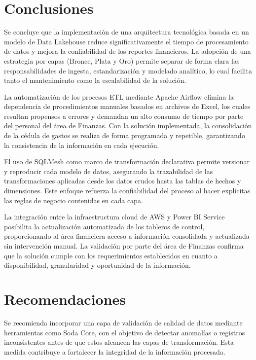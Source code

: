\section{Conclusiones}

Se concluye que la implementación de una arquitectura tecnológica basada en un modelo de Data Lakehouse reduce significativamente el tiempo de procesamiento de datos y mejora la confiabilidad de los reportes financieros. La adopción de una estrategia por capas (Bronce, Plata y Oro) permite separar de forma clara las responsabilidades de ingesta, estandarización y modelado analítico, lo cual facilita tanto el mantenimiento como la escalabilidad de la solución.

La automatización de los procesos ETL mediante Apache Airflow elimina la dependencia de procedimientos manuales basados en archivos de Excel, los cuales resultan propensos a errores y demandan un alto consumo de tiempo por parte del personal del área de Finanzas. Con la solución implementada, la consolidación de la cédula de gastos se realiza de forma programada y repetible, garantizando la consistencia de la información en cada ejecución.

El uso de SQLMesh como marco de transformación declarativa permite versionar y reproducir cada modelo de datos, asegurando la trazabilidad de las transformaciones aplicadas desde los datos crudos hasta las tablas de hechos y dimensiones. Este enfoque refuerza la confiabilidad del proceso al hacer explícitas las reglas de negocio contenidas en cada capa.

La integración entre la infraestructura cloud de AWS y Power BI Service posibilita la actualización automatizada de los tableros de control, proporcionando al área financiera acceso a información consolidada y actualizada sin intervención manual. La validación por parte del área de Finanzas confirma que la solución cumple con los requerimientos establecidos en cuanto a disponibilidad, granularidad y oportunidad de la información.

\section{Recomendaciones}

Se recomienda incorporar una capa de validación de calidad de datos mediante herramientas como Soda Core, con el objetivo de detectar anomalías o registros inconsistentes antes de que estos alcancen las capas de transformación. Esta medida contribuye a fortalecer la integridad de la información procesada.

